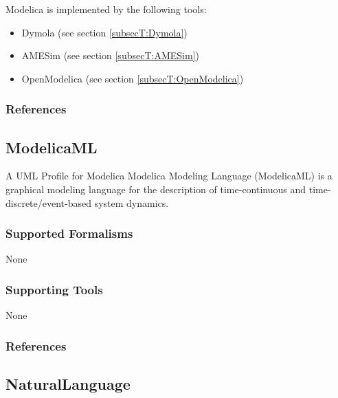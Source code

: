 Modelica is implemented by the following tools:
\begin{itemize}
	\item Dymola (see section \ref{subsecT:Dymola})
	\item AMESim (see section \ref{subsecT:AMESim})
	\item OpenModelica (see section \ref{subsecT:OpenModelica})
\end{itemize}


\subsubsection{References}





\subsection{ModelicaML}
\label{subsecL:ModelicaML}


A UML Profile for Modelica
Modelica Modeling Language (ModelicaML) is a graphical modeling language for the description of time-continuous and time-discrete/event-based system dynamics.

\subsubsection{Supported Formalisms}

None


\subsubsection{Supporting Tools}

None


\subsubsection{References}





\subsection{NaturalLanguage}
\label{subsecL:NaturalLanguage}


